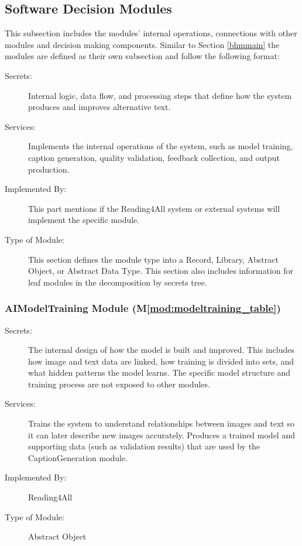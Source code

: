 \documentclass[12pt, titlepage]{article}
\newcommand{\mref}[1]{M\ref{#1}}
\begin{document}
\subsection{Software Decision Modules}
\label{mod:sdmmain}
This subsection includes the modules' internal operations,
connections with other modules and decision making components.
Similar to Section \ref{bhmmain} the modules are defined as their own
subsection and follow the following format:

\begin{description}
  \item[Secrets:] Internal logic, data flow, and processing steps
    that define how the system produces and improves alternative text.
  \item[Services:] Implements the internal operations of the system,
    such as model training, caption generation, quality validation,
    feedback collection, and output production.
  \item[Implemented By:] This part mentions if the Reading4All system
    or external systems will
    implement the specific module.
  \item[Type of Module:] This section defines the module type into a
    Record, Library, Abstract
    Object, or Abstract Data Type. This section also includes
    information for leaf modules in the decomposition by secrets tree.
\end{description}

\subsubsection{AIModelTraining Module (\mref{mod:modeltraining_table})}
\label{mod:modeltraining}
\begin{description}
  \item[Secrets:] The internal design of how the model is built and
    improved. This includes how image and text data are linked, how
    training is divided into sets, and what hidden patterns the model
    learns. The specific model structure and training process are not
    exposed to other modules.
  \item[Services:] Trains the system to understand relationships
    between images and text so it can later describe new images
    accurately. Produces a trained model and supporting data (such as
    validation results) that are used by the CaptionGeneration module.
  \item[Implemented By:] Reading4All
  \item[Type of Module:] Abstract Object
\end{description}
\end{document}

